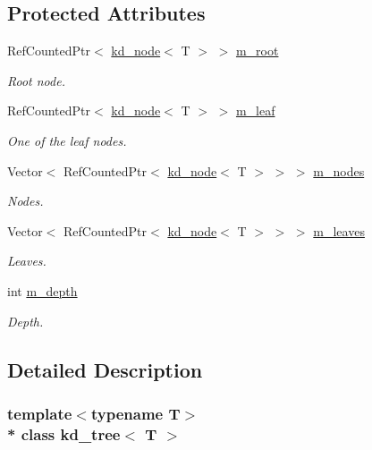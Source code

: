 \subsection*{Protected Attributes}
\begin{DoxyCompactItemize}
\item 
Ref\+Counted\+Ptr$<$ \hyperlink{classkd__node}{kd\+\_\+node}$<$ T $>$ $>$ \hyperlink{classkd__tree_a690081f36464e477e7a670131413e90a}{m\+\_\+root}
\begin{DoxyCompactList}\small\item\em Root node. \end{DoxyCompactList}\item 
Ref\+Counted\+Ptr$<$ \hyperlink{classkd__node}{kd\+\_\+node}$<$ T $>$ $>$ \hyperlink{classkd__tree_a9c9ee020f19e2bc6e092c720dec17876}{m\+\_\+leaf}
\begin{DoxyCompactList}\small\item\em One of the leaf nodes. \end{DoxyCompactList}\item 
Vector$<$ Ref\+Counted\+Ptr$<$ \hyperlink{classkd__node}{kd\+\_\+node}$<$ T $>$ $>$ $>$ \hyperlink{classkd__tree_a81a614de43db81a4975595c15bb50449}{m\+\_\+nodes}
\begin{DoxyCompactList}\small\item\em Nodes. \end{DoxyCompactList}\item 
Vector$<$ Ref\+Counted\+Ptr$<$ \hyperlink{classkd__node}{kd\+\_\+node}$<$ T $>$ $>$ $>$ \hyperlink{classkd__tree_ab0e027509eb1151fc13e3e4d54d21f08}{m\+\_\+leaves}
\begin{DoxyCompactList}\small\item\em Leaves. \end{DoxyCompactList}\item 
int \hyperlink{classkd__tree_a587276a40678198a1f08ce0dfda12ded}{m\+\_\+depth}
\begin{DoxyCompactList}\small\item\em Depth. \end{DoxyCompactList}\end{DoxyCompactItemize}


\subsection{Detailed Description}
\subsubsection*{template$<$typename T$>$\\*
class kd\+\_\+tree$<$ T $>$}


